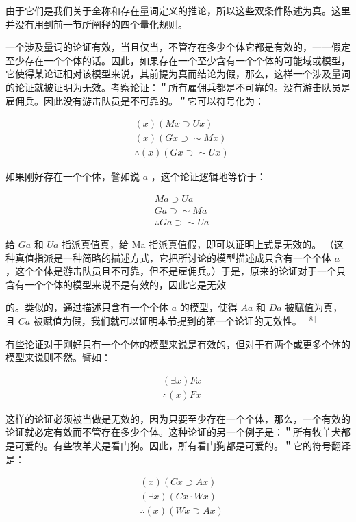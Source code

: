 由于它们是我们关于全称和存在量词定义的推论，所以这些双条件陈述为真。这里并没有用到前一节所阐释的四个量化规则。

一个涉及量词的论证有效，当且仅当，不管存在多少个体它都是有效的，一一假定至少存在一个个体的话。因此，如果存在一个至少含有一个个体的可能域或模型，它使得某论证相对该模型来说，其前提为真而结论为假，那么，这样一个涉及量词的论证就被证明为无效。考察论证：＂所有雇佣兵都是不可靠的。没有游击队员是雇佣兵。因此没有游击队员是不可靠的。＂它可以符号化为：

$$
\begin{aligned}
& (x)(M x \supset U x) \\
& (x)(G x \supset \sim M x) \\
& \therefore(x)(G x \supset \sim U x)
\end{aligned}
$$

如果刚好存在一个个体，譬如说 $a$ ，这个论证逻辑地等价于：

$$
\begin{aligned}
& M a \supset U a \\
& G a \supset \sim M a \\
& \therefore G a \supset \sim U a
\end{aligned}
$$

给 $G a$ 和 $U a$ 指派真值真，给 Ma 指派真值假，即可以证明上式是无效的。 （这种真值指派是一种简略的描述方式，它把所讨论的模型描述成只含有一个个体 $a$ ，这个个体是游击队员且不可靠，但不是雇佣兵。）于是，原来的论证对于一个只含有一个个体的模型来说不是有效的，因此它是无效

的。类似的，通过描述只含有一个个体 $a$ 的模型，使得 $A a$ 和 $D a$ 被赋值为真，且 $C a$ 被赋值为假，我们就可以证明本节提到的第一个论证的无效性。 ${ }^{[8]}$

有些论证对于刚好只有一个个体的模型来说是有效的，但对于有两个或更多个体的模型来说则不然。譬如：

$$
\begin{aligned}
& (\exists x) F x \\
& \therefore(x) F x
\end{aligned}
$$

这样的论证必须被当做是无效的，因为只要至少存在一个个体，那么，一个有效的论证就必定有效而不管存在多少个体。这种论证的另一个例子是：＂所有牧羊犬都是可爱的。有些牧羊犬是看门狗。因此，所有看门狗都是可爱的。＂它的符号翻译是：

$$
\begin{aligned}
& (x)(C x \supset A x) \\
& (\exists x)(C x \cdot W x) \\
& \therefore(x)(W x \supset A x)
\end{aligned}
$$

